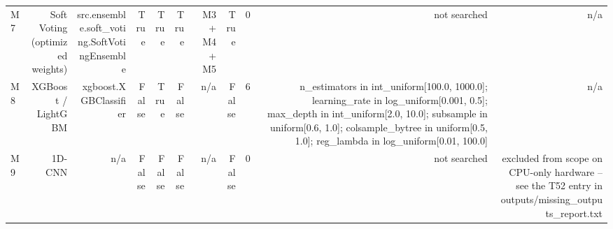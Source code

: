 \begin{table}[htbp]
\begin{tabular}{lrrrrrrrrrr}
    M7 & Soft Voting (optimized weights) & src.ensemble.soft\_voting.SoftVotingEnsemble & True & True & True & M3 + M4 + M5 & True & 0 & not searched & n/a \\
    M8 & XGBoost / LightGBM & xgboost.XGBClassifier & False & True & False & n/a & False & 6 & n\_estimators in int\_uniform[100.0, 1000.0]; learning\_rate in log\_uniform[0.001, 0.5]; max\_depth in int\_uniform[2.0, 10.0]; subsample in uniform[0.6, 1.0]; colsample\_bytree in uniform[0.5, 1.0]; reg\_lambda in log\_uniform[0.01, 100.0] & n/a \\
    M9 & 1D-CNN & n/a & False & False & False & n/a & False & 0 & not searched & excluded from scope on CPU-only hardware -- see the T52 entry in outputs/missing\_outputs\_report.txt \\
    \bottomrule
  \end{tabular}
\end{table}
